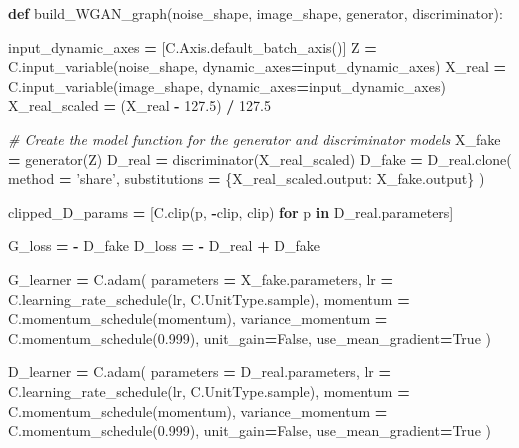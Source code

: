 \documentclass[]{book}
\newenvironment{Shaded}{\begin{snugshade}}{\end{snugshade}}
\newcommand{\KeywordTok}[1]{\textcolor[rgb]{0.13,0.29,0.53}{\textbf{#1}}}
\newcommand{\FloatTok}[1]{\textcolor[rgb]{0.00,0.00,0.81}{#1}}
\newcommand{\StringTok}[1]{\textcolor[rgb]{0.31,0.60,0.02}{#1}}
\newcommand{\CommentTok}[1]{\textcolor[rgb]{0.56,0.35,0.01}{\textit{#1}}}
\newcommand{\VariableTok}[1]{\textcolor[rgb]{0.00,0.00,0.00}{#1}}
\newcommand{\ControlFlowTok}[1]{\textcolor[rgb]{0.13,0.29,0.53}{\textbf{#1}}}
\newcommand{\OperatorTok}[1]{\textcolor[rgb]{0.81,0.36,0.00}{\textbf{#1}}}
\newcommand{\NormalTok}[1]{#1}
\theoremstyle{definition}
\theoremstyle{definition}
\theoremstyle{definition}
\theoremstyle{remark}
\begin{document}
\begin{Shaded}
\begin{Highlighting}[]
\KeywordTok{def}\NormalTok{ build_WGAN_graph(noise_shape, image_shape, generator, discriminator):}
    
\NormalTok{    input_dynamic_axes }\OperatorTok{=}\NormalTok{ [C.Axis.default_batch_axis()]}
\NormalTok{    Z }\OperatorTok{=}\NormalTok{ C.input_variable(noise_shape, dynamic_axes}\OperatorTok{=}\NormalTok{input_dynamic_axes)}
\NormalTok{    X_real }\OperatorTok{=}\NormalTok{ C.input_variable(image_shape, dynamic_axes}\OperatorTok{=}\NormalTok{input_dynamic_axes)}
\NormalTok{    X_real_scaled }\OperatorTok{=}\NormalTok{ (X_real }\OperatorTok{-} \FloatTok{127.5}\NormalTok{) }\OperatorTok{/} \FloatTok{127.5}

    \CommentTok{# Create the model function for the generator and discriminator models}
\NormalTok{    X_fake }\OperatorTok{=}\NormalTok{ generator(Z)}
\NormalTok{    D_real }\OperatorTok{=}\NormalTok{ discriminator(X_real_scaled)}
\NormalTok{    D_fake }\OperatorTok{=}\NormalTok{ D_real.clone(}
\NormalTok{        method }\OperatorTok{=} \StringTok{'share'}\NormalTok{,}
\NormalTok{        substitutions }\OperatorTok{=}\NormalTok{ \{X_real_scaled.output: X_fake.output\}}
\NormalTok{    )}
    
\NormalTok{    clipped_D_params }\OperatorTok{=}\NormalTok{ [C.clip(p, }\OperatorTok{-}\NormalTok{clip, clip) }\ControlFlowTok{for}\NormalTok{ p }\KeywordTok{in}\NormalTok{ D_real.parameters]}
    
\NormalTok{    G_loss }\OperatorTok{=} \OperatorTok{-}\NormalTok{ D_fake}
\NormalTok{    D_loss }\OperatorTok{=} \OperatorTok{-}\NormalTok{ D_real }\OperatorTok{+}\NormalTok{ D_fake}

\NormalTok{    G_learner }\OperatorTok{=}\NormalTok{ C.adam(}
\NormalTok{            parameters }\OperatorTok{=}\NormalTok{ X_fake.parameters,}
\NormalTok{            lr }\OperatorTok{=}\NormalTok{ C.learning_rate_schedule(lr, C.UnitType.sample),}
\NormalTok{            momentum }\OperatorTok{=}\NormalTok{ C.momentum_schedule(momentum),}
\NormalTok{            variance_momentum }\OperatorTok{=}\NormalTok{ C.momentum_schedule(}\FloatTok{0.999}\NormalTok{),}
\NormalTok{            unit_gain}\OperatorTok{=}\VariableTok{False}\NormalTok{,}
\NormalTok{            use_mean_gradient}\OperatorTok{=}\VariableTok{True}
\NormalTok{    )}
            
\NormalTok{    D_learner }\OperatorTok{=}\NormalTok{ C.adam(}
\NormalTok{            parameters }\OperatorTok{=}\NormalTok{ D_real.parameters,}
\NormalTok{            lr }\OperatorTok{=}\NormalTok{ C.learning_rate_schedule(lr, C.UnitType.sample),}
\NormalTok{            momentum }\OperatorTok{=}\NormalTok{ C.momentum_schedule(momentum),}
\NormalTok{            variance_momentum }\OperatorTok{=}\NormalTok{ C.momentum_schedule(}\FloatTok{0.999}\NormalTok{),}
\NormalTok{            unit_gain}\OperatorTok{=}\VariableTok{False}\NormalTok{,}
\NormalTok{            use_mean_gradient}\OperatorTok{=}\VariableTok{True}
\NormalTok{    )}
    

\end{Highlighting}
\end{Shaded}
\end{document}
